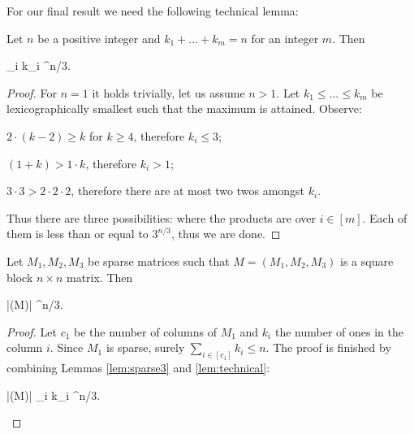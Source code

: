 For our final result we need the following technical lemma:

\begin{lem}
\label{lem:technical}
Let $n$ be a positive integer and $k_1 + \dots + k_m = n$ for an integer $m$. Then
\begin{cosyeqnarray}
	\prod_{i \in [m]} k_i ^{n/3}.
\end{cosyeqnarray}%
\end{lem}
\begin{proof}
For $n=1$ it holds trivially, let us assume $n > 1$. Let $k_1 \leq \dots \leq k_m$ be lexicographically smallest such that the maximum is attained. Observe:
\begin{cosyitemize}
	\item $2 \cdot (k-2) \geq k$ for $k \geq 4$, therefore $k_i \leq 3$;
	\item $(1+k) > 1 \cdot k$, therefore $k_i > 1$;
	\item $3 \cdot 3 > 2 \cdot 2 \cdot 2$, therefore there are at most two twos amongst $k_i$.
\end{cosyitemize}%
Thus there are three possibilities:
%
where the products are over $i \in [m]$. Each of them is less than or equal to $3^{n/3}$, thus we are done.
\end{proof}

\begin{lem}
\label{lem:3-block-sparse-det}
Let $M_1,M_2,M_3$ be sparse matrices such that $M = (M_1,M_2,M_3)$ is a  square block $n \times n$ matrix. Then
\begin{cosyeqnarray}
 	|\det(M)| ^{n/3}.
\end{cosyeqnarray}%
\end{lem}
\begin{proof}
Let $c_1$ be the number of columns of $M_1$ and $k_i$ the number of ones in the column $i$. Since $M_1$ is sparse, surely $\sum_{i \in [c_1]} k_i \leq n$. The proof is finished by combining Lemmas \ref{lem:sparse3} and \ref{lem:technical}:
\begin{cosyeqnarray}
	|\det(M)| \leq \prod_{i \in [c_1]} k_i ^{n/3}.
\end{cosyeqnarray}%
\end{proof}

